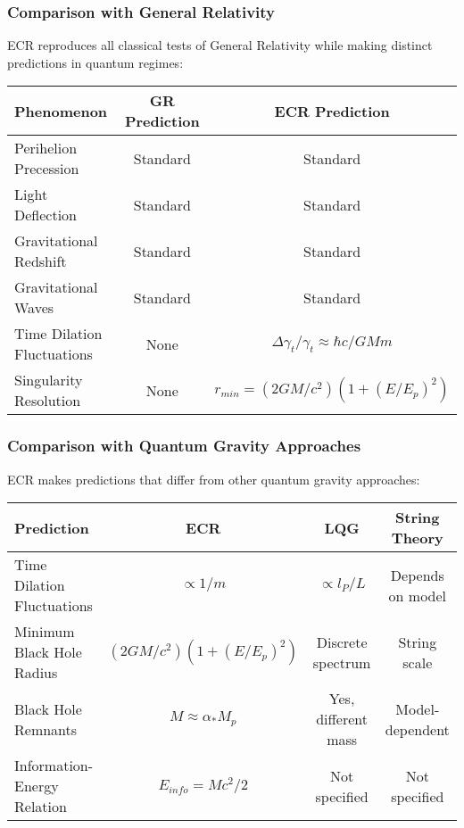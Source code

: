 \documentclass[11pt,a4paper]{article}
\begin{document}
\subsubsection{Comparison with General Relativity}

ECR reproduces all classical tests of General Relativity while making distinct predictions in quantum regimes:

\begin{table}[h]
\centering
\begin{tabular}{|l|c|c|}
\hline
\textbf{Phenomenon} & \textbf{GR Prediction} & \textbf{ECR Prediction} \\
\hline
Perihelion Precession & Standard & Standard \\
Light Deflection & Standard & Standard \\
Gravitational Redshift & Standard & Standard \\
Gravitational Waves & Standard & Standard \\
Time Dilation Fluctuations & None & $\Delta\gamma_t/\gamma_t \approx \hbar c/GMm$ \\
Singularity Resolution & None & $r_{min} = (2GM/c^2)(1+(E/E_p)^2)$ \\
\hline
\end{tabular}
\end{table}

\subsubsection{Comparison with Quantum Gravity Approaches}

ECR makes predictions that differ from other quantum gravity approaches:

\begin{table}[h]
\centering
\begin{tabular}{|l|c|c|c|}
\hline
\textbf{Prediction} & \textbf{ECR} & \textbf{LQG} & \textbf{String Theory} \\
\hline
Time Dilation Fluctuations & $\propto 1/m$ & $\propto l_P/L$ & Depends on model \\
Minimum Black Hole Radius & $(2GM/c^2)(1+(E/E_p)^2)$ & Discrete spectrum & String scale \\
Black Hole Remnants & $M \approx \alpha_* M_p$ & Yes, different mass & Model-dependent \\
Information-Energy Relation & $E_{info} = Mc^2/2$ & Not specified & Not specified \\
\hline
\end{tabular}
\end{table}
\end{document}
